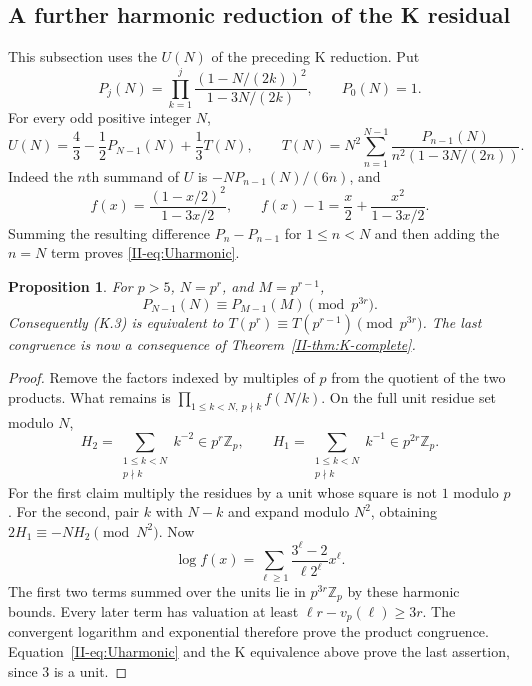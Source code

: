 \documentclass[11pt,letterpaper]{article}
\newtheorem{proposition}[theorem]{Proposition}
\numberwithin{equation}{section}
\begin{document}
\subsection{A further harmonic reduction of the K residual}
This subsection uses the $U(N)$ of the preceding K reduction. Put
\[
 P_j(N)=\prod_{k=1}^j\frac{(1-N/(2k))^2}{1-3N/(2k)},\qquad P_0(N)=1.
\]
For every odd positive integer $N$,
\begin{equation}\label{II-eq:Uharmonic}
 U(N)=\frac43-\frac12P_{N-1}(N)+\frac13T(N),\qquad
 T(N)=N^2\sum_{n=1}^{N-1}\frac{P_{n-1}(N)}{n^2(1-3N/(2n))}.
\end{equation}
Indeed the $n$th summand of $U$ is $-NP_{n-1}(N)/(6n)$, and
\[
 f(x)=\frac{(1-x/2)^2}{1-3x/2},\qquad
 f(x)-1=\frac{x}{2}+\frac{x^2}{1-3x/2}.
\]
Summing the resulting difference $P_n-P_{n-1}$ for $1\le n<N$
and then adding the $n=N$ term proves \eqref{II-eq:Uharmonic}.

\begin{proposition}
For $p>5$, $N=p^r$, and $M=p^{r-1}$,
\[
 P_{N-1}(N)\equiv P_{M-1}(M)\pmod{p^{3r}}.
\]
Consequently (K.3) is equivalent to
$T(p^r)\equiv T(p^{r-1})\pmod{p^{3r}}$.
The last congruence is now a consequence of Theorem~\ref{II-thm:K-complete}.
\end{proposition}
\begin{proof}
Remove the factors indexed by multiples of $p$ from the quotient of
the two products. What remains is $\prod_{1\le k<N,\ p\nmid k}f(N/k)$.
On the full unit residue set modulo $N$,
\[
 H_2=\sum_{\substack{1\le k<N\\p\nmid k}}k^{-2}\in p^r\mathbb Z_p,
 \qquad
 H_1=\sum_{\substack{1\le k<N\\p\nmid k}}k^{-1}\in p^{2r}\mathbb Z_p.
\]
For the first claim multiply the residues by a unit whose square is
not $1$ modulo $p$. For the second, pair $k$ with $N-k$ and expand
modulo $N^2$, obtaining $2H_1\equiv-NH_2\pmod{N^2}$.
Now
\[
 \log f(x)=\sum_{\ell\ge1}\frac{3^\ell-2}{\ell2^\ell}x^\ell.
\]
The first two terms summed over the units lie in $p^{3r}\mathbb Z_p$
by these harmonic bounds. Every later term has valuation at least
$\ell r-v_p(\ell)\ge3r$. The convergent logarithm and exponential
therefore prove the product congruence. Equation~\eqref{II-eq:Uharmonic}
and the K equivalence above prove the last assertion, since $3$ is a unit.
\end{proof}


\end{document}
